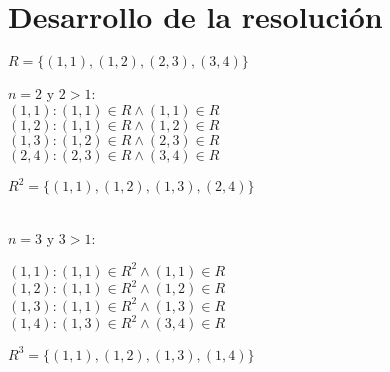 \documentclass{article}
\begin{document}
\section*{Desarrollo de la resolución}
$R =\lbrace{(1, 1),(1, 2),(2, 3),(3, 4)}\rbrace$
\begin{center}
$n = 2$ y $2 > 1$:
\\
$(1,1) : (1,1) \in R \wedge (1,1) \in R$
\\$(1,2) : (1,1) \in R \wedge (1,2) \in R$
\\$(1,3) : (1,2) \in R \wedge (2,3) \in R$
\\$(2,4) : (2,3) \in R \wedge (3,4) \in R$
\end{center}
$R^2 = \lbrace{(1, 1),(1, 2),(1, 3),(2, 4)}\rbrace$
\\
\\
\begin{center}
 $n = 3$ y $3 > 1$:

$(1,1) : (1,1) \in R^2 \wedge (1,1) \in R$
\\$(1,2) : (1,1) \in R^2 \wedge (1,2) \in R$
\\$(1,3) : (1,1) \in R^2 \wedge (1,3) \in R$
\\$(1,4) : (1,3) \in R^2 \wedge (3,4) \in R$
\end{center}
$R^3 = \lbrace{(1, 1),(1, 2),(1, 3),(1, 4)}\rbrace$
\end{document}
